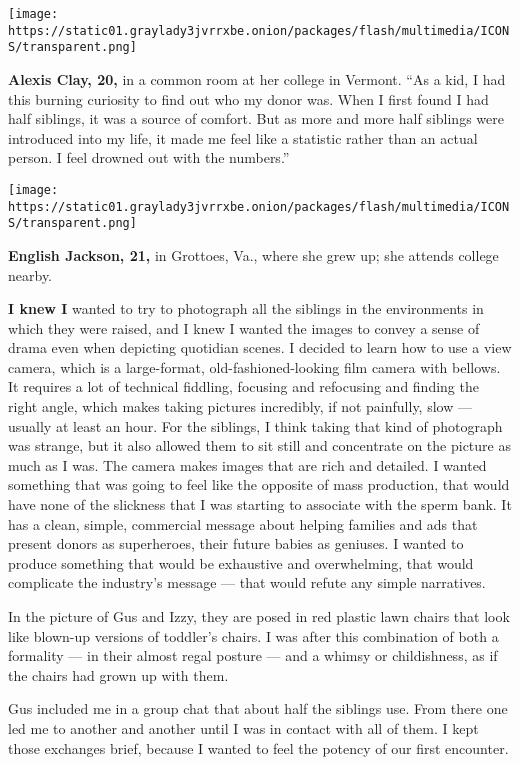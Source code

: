 \texttt{[image: https://static01.graylady3jvrrxbe.onion/packages/flash/multimedia/ICONS/transparent.png]}

\textbf{Alexis Clay, 20,} in a common room at her college in Vermont.
``As a kid, I had this burning curiosity to find out who my donor was.
When I first found I had half siblings, it was a source of comfort. But
as more and more half siblings were introduced into my life, it made me
feel like a statistic rather than an actual person. I feel drowned out
with the numbers.''

\texttt{[image: https://static01.graylady3jvrrxbe.onion/packages/flash/multimedia/ICONS/transparent.png]}

\textbf{English Jackson, 21,} in Grottoes, Va., where she grew up; she
attends college nearby.

\textbf{I knew I} wanted to try to photograph all the siblings in the
environments in which they were raised, and I knew I wanted the images
to convey a sense of drama even when depicting quotidian scenes. I
decided to learn how to use a view camera, which is a large-format,
old-fashioned-looking film camera with bellows. It requires a lot of
technical fiddling, focusing and refocusing and finding the right angle,
which makes taking pictures incredibly, if not painfully, slow ---
usually at least an hour. For the siblings, I think taking that kind of
photograph was strange, but it also allowed them to sit still and
concentrate on the picture as much as I was. The camera makes images
that are rich and detailed. I wanted something that was going to feel
like the opposite of mass production, that would have none of the
slickness that I was starting to associate with the sperm bank. It has a
clean, simple, commercial message about helping families and ads that
present donors as superheroes, their future babies as geniuses. I wanted
to produce something that would be exhaustive and overwhelming, that
would complicate the industry's message --- that would refute any simple
narratives.

In the picture of Gus and Izzy, they are posed in red plastic lawn
chairs that look like blown-up versions of toddler's chairs. I was after
this combination of both a formality --- in their almost regal posture
--- and a whimsy or childishness, as if the chairs had grown up with
them.

Gus included me in a group chat that about half the siblings use. From
there one led me to another and another until I was in contact with all
of them. I kept those exchanges brief, because I wanted to feel the
potency of our first encounter.

